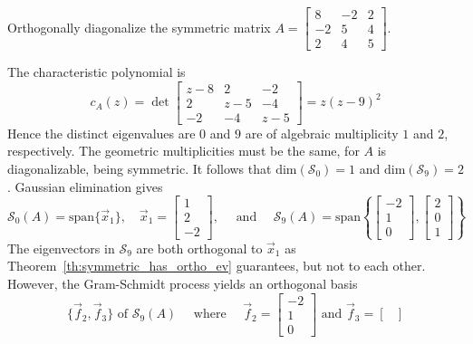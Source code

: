 \documentclass{ximera}
\begin{document}
\begin{example}\label{exa:ortho_diag_symm}
Orthogonally diagonalize the symmetric matrix $A = \begin{bmatrix}
8 & -2 & 2 \\
-2 & 5 & 4 \\
2 & 4 & 5
\end{bmatrix}$.


\begin{explanation}
  The characteristic polynomial is
\begin{equation*}
c_{A}(z) = \det  \begin{bmatrix}
z-8 & 2 & -2 \\
2 & z-5 & -4 \\
-2 & -4 & z-5
\end{bmatrix} = z(z-9)^2
\end{equation*}
Hence the distinct eigenvalues are $0$ and $9$ are of algebraic multiplicity $1$ and $2$, respectively.  The geometric multiplicities must be the same, for $A$ is diagonalizable, being symmetric. It follows that $\mbox{dim}(\mathcal{S}_0) = 1$ and $\mbox{dim}(\mathcal{S}_9) = 2$.  Gaussian elimination gives
\begin{equation*}
\mathcal{S}_{0}(A) = \mbox{span}\{\vec{x}_{1}\}, \quad \vec{x}_{1} = \begin{bmatrix}
1 \\
2 \\
-2
\end{bmatrix}, \quad \mbox{ and } \quad \mathcal{S}_{9}(A) = \mbox{span} \left\lbrace \begin{bmatrix}
	-2 \\
	1 \\
	0
	\end{bmatrix}, \begin{bmatrix}
2 \\
0 \\
1
\end{bmatrix} \right\rbrace
\end{equation*}
The eigenvectors in $\mathcal{S}_{9}$ are both orthogonal to $\vec{x}_{1}$ as Theorem~\ref{th:symmetric_has_ortho_ev} guarantees, but not to each other. However, the Gram-Schmidt process yields an orthogonal basis
\begin{equation*}
\{\vec{f}_{2}, \vec{f}_{3}\} \mbox{ of } \mathcal{S}_{9}(A) \quad \mbox{ where } \quad \vec{f}_{2} = \begin{bmatrix}
-2 \\
1 \\
0
\end{bmatrix} \mbox{ and }  \vec{f}_{3} = \begin{bmatrix}

\end{bmatrix}
\end{equation*}
\end{explanation}
\end{example}
\end{document}
